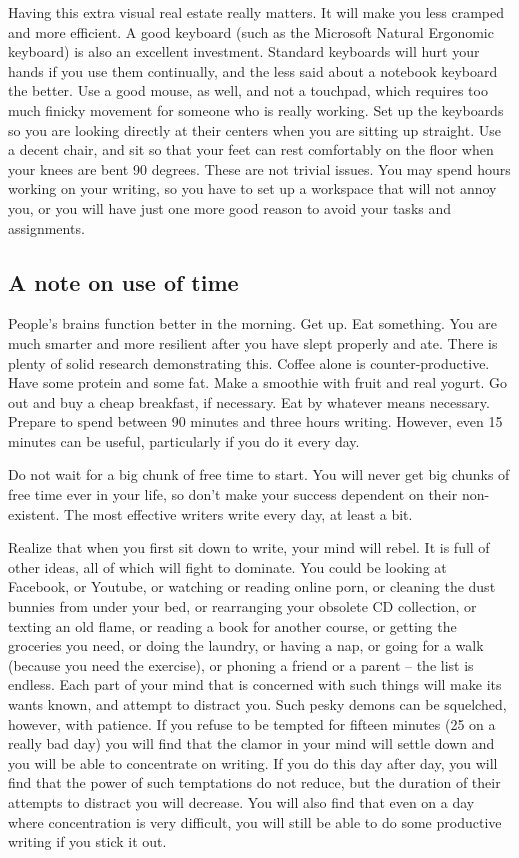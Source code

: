 \documentclass{article}
\begin{document}
Having this extra visual real estate really matters. It will make you
less cramped and more efficient. A good keyboard (such as the Microsoft
Natural Ergonomic keyboard) is also an excellent investment. Standard
keyboards will hurt your hands if you use them continually, and the less
said about a notebook keyboard the better. Use a good mouse, as well,
and not a touchpad, which requires too much finicky movement for someone
who is really working. Set up the keyboards so you are looking directly
at their centers when you are sitting up straight. Use a decent chair,
and sit so that your feet can rest comfortably on the floor when your
knees are bent 90 degrees. These are not trivial issues. You may spend
hours working on your writing, so you have to set up a workspace that
will not annoy you, or you will have just one more good reason to avoid
your tasks and assignments.

\subsection{A note on use of time}

People's brains function better in the morning. Get up. Eat something.
You are much smarter and more resilient after you have slept properly
and ate. There is plenty of solid research demonstrating this. Coffee
alone is counter-productive. Have some protein and some fat. Make a
smoothie with fruit and real yogurt. Go out and buy a cheap breakfast,
if necessary. Eat by whatever means necessary. Prepare to spend between
90 minutes and three hours writing. However, even 15 minutes can be
useful, particularly if you do it every day.

Do not wait for a big chunk of free time to start. You will never get
big chunks of free time ever in your life, so don't make your success
dependent on their non-existent. The most effective writers write every
day, at least a bit.

Realize that when you first sit down to write, your mind will rebel. It
is full of other ideas, all of which will fight to dominate. You could
be looking at Facebook, or Youtube, or watching or reading online porn,
or cleaning the dust bunnies from under your bed, or rearranging your
obsolete CD collection, or texting an old flame, or reading a book for
another course, or getting the groceries you need, or doing the laundry,
or having a nap, or going for a walk (because you need the exercise), or
phoning a friend or a parent -- the list is endless. Each part of your
mind that is concerned with such things will make its wants known, and
attempt to distract you. Such pesky demons can be squelched, however,
with patience. If you refuse to be tempted for fifteen minutes (25 on a
really bad day) you will find that the clamor in your mind will settle
down and you will be able to concentrate on writing. If you do this day
after day, you will find that the power of such temptations do not
reduce, but the duration of their attempts to distract you will
decrease. You will also find that even on a day where concentration is
very difficult, you will still be able to do some productive writing if
you stick it out.
\end{document}
